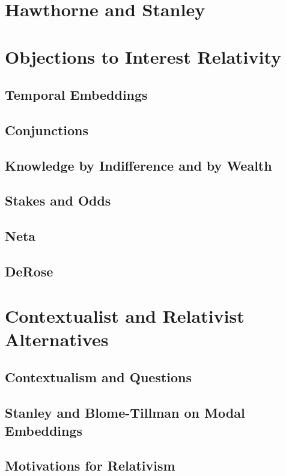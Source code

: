 \documentclass[oneside]{book}
\begin{document}


\chapter{Hawthorne and Stanley}

\chapter{Objections to Interest Relativity}

\section{Temporal Embeddings}



\section{Conjunctions}



\section{Knowledge by Indifference and by Wealth}



\section{Stakes and Odds}



\section{Neta}

\section{DeRose}

\chapter{Contextualist and Relativist Alternatives}

\section{Contextualism and Questions}

\section{Stanley and Blome-Tillman on Modal Embeddings}



\section{Motivations for Relativism}



\newpage
{}


\end{document}

